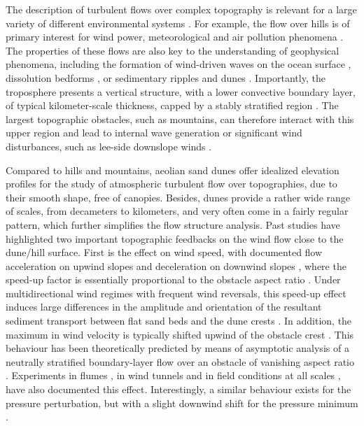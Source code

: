 The description of turbulent flows over complex topography is relevant for a large variety of different environmental systems \citep{Sherman1978, Walmsley1982, baines1995, Wood2000, Venditti2013, Finnigan2020}. For example, the flow over hills is of primary interest for wind power, meteorological and air pollution phenomena \citep{Taylor1987}. The properties of these flows are also key to the understanding of geophysical phenomena, including the formation of wind-driven waves on the ocean surface \citep{Sullivan2010}, dissolution bedforms \citep{Claudin2017, Guerin2020}, or sedimentary ripples and dunes \citep{Bagnold1941, Charru2013, Courrech2015}. Importantly, the troposphere presents a vertical structure, with a lower convective boundary layer, of typical kilometer-scale thickness, capped by a stably stratified region \citep{Stull1988}. The largest topographic obstacles, such as mountains, can therefore interact with this upper region and lead to internal wave generation or significant wind disturbances, such as lee-side downslope winds \citep{Durran1990}.

Compared to hills and mountains, aeolian sand dunes offer idealized elevation profiles for the study of atmospheric turbulent flow over topographies, due to their smooth shape, free of canopies. Besides, dunes provide a rather wide range of scales, from decameters to kilometers, and very often come in a fairly regular pattern, which further simplifies the flow structure analysis. Past studies have highlighted two important topographic feedbacks on the wind flow close to the dune/hill surface.
%
First is the effect on wind speed, with documented flow acceleration on upwind slopes \citep{Weaver2011} and deceleration on downwind slopes \citep{Baddock2007}, where the speed-up factor is essentially proportional to the obstacle aspect ratio \citep{Jackson1975}. Under multidirectional wind regimes with frequent wind reversals, this speed-up effect induces large differences in the amplitude and orientation of the resultant sediment transport between flat sand beds and the dune crests \citep{Zhang2014, Rozir2019, Geo2021}. In addition, the maximum in wind velocity is typically shifted upwind of the obstacle crest \citep{Jackson1975, Claudin2013}. This behaviour has been theoretically predicted by means of asymptotic analysis of a neutrally stratified boundary-layer flow over an obstacle of vanishing aspect ratio \citep{Jackson1975, Mason1979, Sykes1980, Hunt1988, Belcher1998, Kroy2002}. Experiments in flumes \citep{Zilker1977, Zilker1979, Frederick1988, Poggi2007, Bristow2022}, in wind tunnels \citep{Gong1989, Finnigan1990, Gong1996} and in field conditions at all scales \citep{Taylor1987a, Claudin2013, Fernando2019, Lu2021}, have also documented this effect. Interestingly, a similar behaviour exists for the pressure perturbation, but with a slight downwind shift for the pressure minimum \citep{Claudin2021}.

